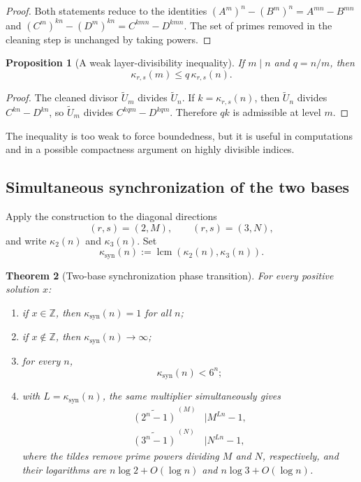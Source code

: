 \documentclass[11pt,oneside]{article}
\newtheorem{theorem}{Theorem}[section]
\newtheorem{proposition}[theorem]{Proposition}
\theoremstyle{definition}
\theoremstyle{remark}
\newcommand{\Z}{\mathbb Z}
\begin{document}
\begin{proof}
Both statements reduce to the identities
$(A^m)^n-(B^m)^n=A^{mn}-B^{mn}$ and
$(C^m)^{kn}-(D^m)^{kn}=C^{kmn}-D^{kmn}$.  The set of primes removed in the cleaning step is
unchanged by taking powers.
\end{proof}

\begin{proposition}[A weak layer-divisibility inequality]
\label{prop:layer-inequality}
If $m\mid n$ and $q=n/m$, then
\[
 \kappa_{r,s}(m)\le q\,\kappa_{r,s}(n).
\]
\end{proposition}

\begin{proof}
The cleaned divisor $\widetilde U_m$ divides $\widetilde U_n$.  If
$k=\kappa_{r,s}(n)$, then $\widetilde U_n$ divides $C^{kn}-D^{kn}$, so
$\widetilde U_m$ divides $C^{kqm}-D^{kqm}$.  Therefore $qk$ is admissible at level $m$.
\end{proof}

The inequality is too weak to force boundedness, but it is useful in computations and in a
possible compactness argument on highly divisible indices.

\subsection{Simultaneous synchronization of the two bases}

Apply the construction to the diagonal directions
\[
 (r,s)=(2,M),\qquad (r,s)=(3,N),
\]
and write $\kappa_2(n)$ and $\kappa_3(n)$.  Set
\[
 \kappa_{\mathrm{syn}}(n):=\operatorname{lcm}(\kappa_2(n),\kappa_3(n)).
\]

\begin{theorem}[Two-base synchronization phase transition]
\label{thm:synchronization}
For every positive solution $x$:
\begin{enumerate}[label=\textup{(\roman*)}]
\item if $x\in\Z$, then $\kappa_{\mathrm{syn}}(n)=1$ for all $n$;
\item if $x\notin\Z$, then $\kappa_{\mathrm{syn}}(n)\to\infty$;
\item for every $n$,
\[
 \kappa_{\mathrm{syn}}(n)<6^n;
\]
\item with $L=\kappa_{\mathrm{syn}}(n)$, the same multiplier simultaneously gives
\begin{align*}
 \widetilde{(2^n-1)}^{\,(M)}&\mid M^{Ln}-1,\\
 \widetilde{(3^n-1)}^{\,(N)}&\mid N^{Ln}-1,
\end{align*}
where the tildes remove prime powers dividing $M$ and $N$, respectively, and their logarithms
are $n\log2+O(\log n)$ and $n\log3+O(\log n)$.
\end{enumerate}
\end{theorem}
\end{document}
